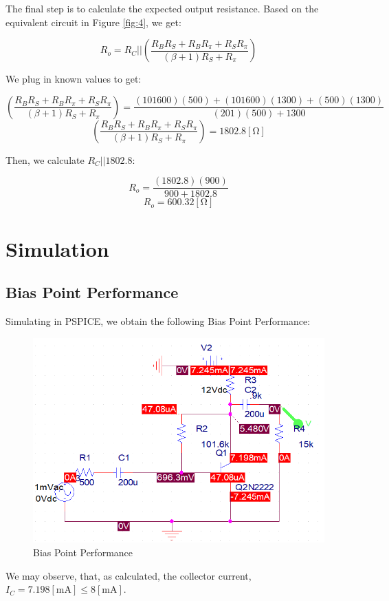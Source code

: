 \documentclass[
	letterpaper, %
	10pt, %
]{CSUniSchoolLabReport}
\begin{document}
The final step is to calculate the expected output resistance. Based on the equivalent circuit in Figure \ref{fig:4}, we get:

$$R_o=R_C||\left( \frac{R_BR_S+R_BR_{\pi}+R_SR_{\pi}}{(\beta+1)R_S+R_{\pi}} \right)$$

We plug in known values to get:

$$\left( \frac{R_BR_S+R_BR_{\pi}+R_SR_{\pi}}{(\beta+1)R_S+R_{\pi}} \right)=\frac{(101600)(500)+(101600)(1300)+(500)(1300)}{(201)(500)+1300}$$
$$\left( \frac{R_BR_S+R_BR_{\pi}+R_SR_{\pi}}{(\beta+1)R_S+R_{\pi}} \right)=1802.8[\si{\ohm}]$$

Then, we calculate $R_C||1802.8$:

$$R_o=\frac{(1802.8)(900)}{900+1802.8}$$
$$\boxed{R_o=600.32[\si{\ohm}]}$$

\section{Simulation}

\subsection{Bias Point Performance}

Simulating in PSPICE, we obtain the following Bias Point Performance:

\begin{figure}[H]
  \centering
  \includegraphics[width=.9\textwidth]{Figures/HW89-PartD}
  \caption{Bias Point Performance}
  \label{fig:6}
\end{figure}

We may observe, that, as calculated, the collector current, $I_C=7.198[\si{\milli\ampere}]\leq 8[\si{\milli\ampere}]$.
\end{document}
